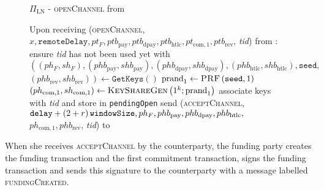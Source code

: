   \begin{figure}[H]
    \begin{protocolbox}{$\Pi_{\mathrm{LN}}$ - \textsc{openChannel} from \bob}
      \begin{algorithmic}[1]
        \State Upon receiving (\textsc{openChannel}, $x, \mathtt{remoteDelay},
        pt_F, ptb_{\mathrm{pay}}, ptb_{\mathrm{dpay}}, ptb_{\mathrm{htlc}},
        pt_{\mathrm{com}, 1}, ptb_{\mathrm{rev}}$, \textit{tid}) from \bob:
        \Indent
          \State ensure \textit{tid} has not been used yet with \bob
          \State $\left(\left(ph_F, sh_F\right), \left(phb_{\mathrm{pay}},
          shb_{\mathrm{pay}}\right), \left(phb_{\mathrm{dpay}},
          shb_{\mathrm{dpay}}\right), \left(phb_{\mathrm{htlc}},
          shb_{\mathrm{htlc}}\right), \mathtt{seed},\right.$
          $\left.\left(phb_{\mathrm{rev}}, shb_{\mathrm{rev}}\right)\right)
          \gets \texttt{GetKeys}\left(\right)$
          \State $\mathrm{prand}_1 \gets \textsc{PRF}\left(\mathtt{seed},
          1\right)$
          \label{alg:protocol:open:peer:prf}
          \State $\left(ph_{\mathrm{com}, 1}, sh_{\mathrm{com}, 1}\right) \gets
          \textsc{KeyShareGen}\left(1^k; \mathrm{prand}_1\right)$
          \State associate keys with \textit{tid} and store in
          \texttt{pendingOpen}
          \label{alg:protocol:open:openChannel:pendingOpen}
          \State send (\textsc{acceptChannel}, $\mathtt{delay}  + \left(2 + r\right)\texttt{windowSize},
          ph_F, phb_{\mathrm{pay}}, phb_{\mathrm{dpay}}, phb_{\mathrm{htlc}},$
          $ph_{\mathrm{com}, 1}, phb_{\mathrm{rev}}$, \textit{tid}) to \bob{}
        \EndIndent
      \end{algorithmic}
    \end{protocolbox}
    \caption{}
    \label{alg:protocol:open:openChannel}
  \end{figure}

  When she receives \textsc{acceptChannel} by the counterparty, the funding
  party creates the funding transaction and the first commitment transaction,
  signs the funding transaction and sends this signature to the counterparty
  with a message labelled \textsc{fundingCreated}.

